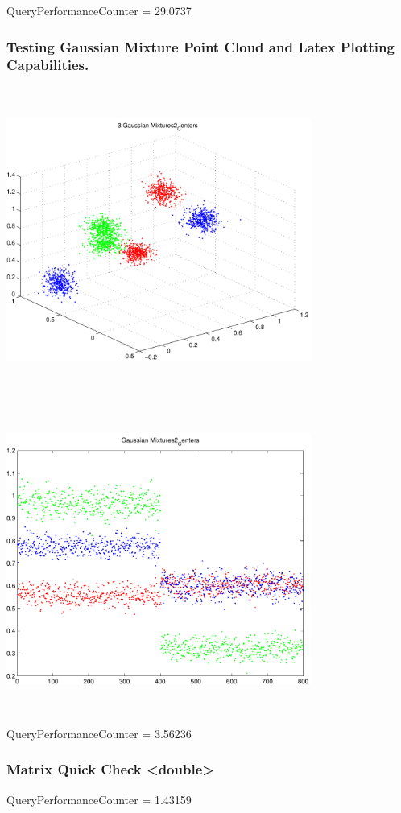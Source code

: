 \documentclass[9pt]{article}
\theoremstyle{plain}
\theoremstyle{definition}
\theoremstyle{remark}
\numberwithin{equation}{section}
\begin{document}
QueryPerformanceCounter  =  29.0737
\subsubsection{Testing Gaussian Mixture Point Cloud and Latex Plotting Capabilities.}
\includegraphics[width=10.0cm,height=10.0cm]{GaussianMixture_Dim_3_Centers2.pdf}

\includegraphics[width=10.0cm,height=10.0cm]{GaussianMixture_Dim_1_Centers2.pdf}

QueryPerformanceCounter  =  3.56236
\subsubsection{Matrix Quick Check <double>}
QueryPerformanceCounter  =  1.43159
\end{document}
